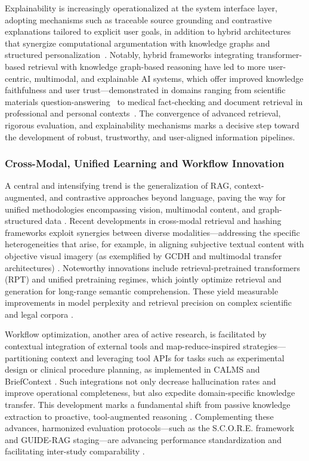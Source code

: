 \documentclass[sigconf]{acmart}
\begin{document}
Explainability is increasingly operationalized at the system interface layer, adopting mechanisms such as traceable source grounding and contrastive explanations tailored to explicit user goals, in addition to hybrid architectures that synergize computational argumentation with knowledge graphs and structured personalization~\cite{ref17,ref24,ref29,ref36,ref37,ref39,ref40,ref43,ref54}. Notably, hybrid frameworks integrating transformer-based retrieval with knowledge graph-based reasoning have led to more user-centric, multimodal, and explainable AI systems, which offer improved knowledge faithfulness and user trust—demonstrated in domains ranging from scientific materials question-answering~\cite{ref29} to medical fact-checking and document retrieval in professional and personal contexts~\cite{ref17,ref36,ref39,ref40,ref54}. The convergence of advanced retrieval, rigorous evaluation, and explainability mechanisms marks a decisive step toward the development of robust, trustworthy, and user-aligned information pipelines.

\subsubsection{Cross-Modal, Unified Learning and Workflow Innovation}

A central and intensifying trend is the generalization of RAG, context-augmented, and contrastive approaches beyond language, paving the way for unified methodologies encompassing vision, multimodal content, and graph-structured data \cite{ref14,ref15,ref20,ref21,ref29,ref30,ref36,ref38,ref54,ref61}. Recent developments in cross-modal retrieval and hashing frameworks exploit synergies between diverse modalities—addressing the specific heterogeneities that arise, for example, in aligning subjective textual content with objective visual imagery (as exemplified by GCDH and multimodal transfer architectures) \cite{ref35,ref38}. Noteworthy innovations include retrieval-pretrained transformers (RPT) and unified pretraining regimes, which jointly optimize retrieval and generation for long-range semantic comprehension. These yield measurable improvements in model perplexity and retrieval precision on complex scientific and legal corpora \cite{ref29,ref31,ref54,ref61}.

Workflow optimization, another area of active research, is facilitated by contextual integration of external tools and map-reduce-inspired strategies—partitioning context and leveraging tool APIs for tasks such as experimental design or clinical procedure planning, as implemented in CALMS and BriefContext \cite{ref5,ref24,ref48}. Such integrations not only decrease hallucination rates and improve operational completeness, but also expedite domain-specific knowledge transfer. This development marks a fundamental shift from passive knowledge extraction to proactive, tool-augmented reasoning \cite{ref28,ref48}. Complementing these advances, harmonized evaluation protocols—such as the S.C.O.R.E. framework and GUIDE-RAG staging—are advancing performance standardization and facilitating inter-study comparability \cite{ref8,ref21,ref28}.
\end{document}
